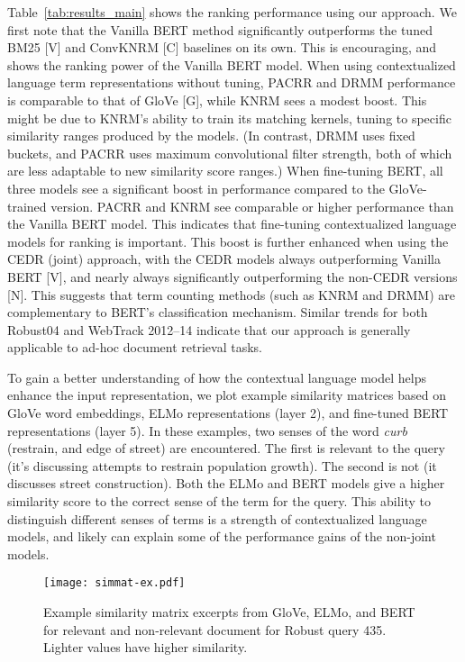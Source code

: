 \documentclass[sigconf]{acmart}
\begin{document}
Table~\ref{tab:results_main} shows the ranking performance using our approach. We first note that the Vanilla BERT method significantly outperforms the tuned BM25 [V] and ConvKNRM [C] baselines on its own. This is encouraging, and shows the ranking power of the Vanilla BERT model. When using contextualized language term representations without tuning, PACRR and DRMM performance is comparable to that of GloVe [G], while KNRM sees a modest boost. This might be due to KNRM's ability to train its matching kernels, tuning to specific similarity ranges produced by the models. (In contrast, DRMM uses fixed buckets, and PACRR uses maximum convolutional filter strength, both of which are less adaptable to new similarity score ranges.) When fine-tuning BERT, all three models see a significant boost in performance compared to the GloVe-trained version. PACRR and KNRM see comparable or higher performance than the Vanilla BERT model. This indicates that fine-tuning contextualized language models for ranking is important. This boost is further enhanced when using the CEDR (joint) approach, with the CEDR models always outperforming Vanilla BERT [V], and nearly always significantly outperforming the non-CEDR versions [N]. This suggests that term counting methods (such as KNRM and DRMM) are complementary to BERT's classification mechanism. Similar trends for both Robust04 and WebTrack 2012--14 indicate that our approach is generally applicable to ad-hoc document retrieval tasks.


To gain a better understanding of how the contextual language model helps enhance the input representation, we plot example similarity matrices based on GloVe word embeddings, ELMo representations (layer 2), and fine-tuned BERT representations (layer 5). In these examples, two senses of the word \textit{curb} (restrain, and edge of street) are encountered. The first is relevant to the query (it's discussing attempts to restrain population growth). The second is not (it discusses street construction). Both the ELMo and BERT models give a higher similarity score to the correct sense of the term for the query.  This ability to distinguish different senses of terms is a strength of contextualized language models, and likely can explain some of the performance gains of the non-joint models.


\begin{figure}
\centering
\texttt{[image: simmat-ex.pdf]}
\vspace{-1em}
\caption{Example similarity matrix excerpts from GloVe, ELMo, and BERT for relevant and non-relevant document for Robust query 435. Lighter values have higher similarity.}
\label{fig:simmat-ex}
\vspace{-0.9em}
\end{figure}
\end{document}
